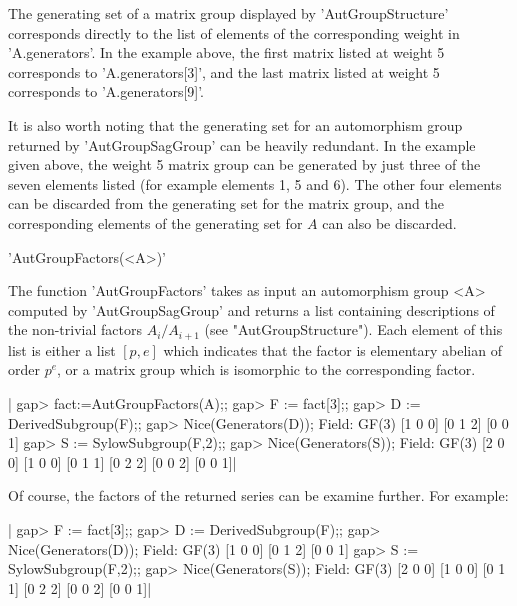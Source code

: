 \bigskip

The generating set of a matrix group displayed by 'AutGroupStructure'
corresponds directly to the list of elements of the corresponding weight in
'A.generators'. In the example above, the first matrix listed at weight 5
corresponds to 'A.generators[3]', and the last matrix listed at weight 5
corresponds to 'A.generators[9]'.


It  is also  worth noting  that the  generating set  for an automorphism group
returned  by 'AutGroupSagGroup' can be heavily redundant. In the example given
above,  the weight 5 matrix group can be  generated by just three of the seven
elements listed (for example elements 1, 5 and 6). The other four elements can
be   discarded  from  the  generating  set  for  the  matrix  group,  and  the
corresponding elements of the generating set for $A$ can also be discarded.


'AutGroupFactors(<A>)' 


The  function  'AutGroupFactors'  takes  as  input  an  automorphism group <A>
computed  by 'AutGroupSagGroup' and returns  a list containing descriptions of
the  non-trivial factors $A_i/A_{i+1}$ (see "AutGroupStructure"). Each element
of  this list  is either  a list  $[p, e]$  which indicates that the factor is
elementary  abelian of order $p^e$,  or a matrix group  which is isomorphic to
the corresponding factor.

|    gap> fact:=AutGroupFactors(A);;
    gap> F := fact[3];;
    gap> D := DerivedSubgroup(F);;
    gap> Nice(Generators(D));
      Field: GF(3)
        [1 0 0]
        [0 1 2]
        [0 0 1]
    gap> S := SylowSubgroup(F,2);;
    gap> Nice(Generators(S));
      Field: GF(3)
        [2 0 0]    [1 0 0]
        [0 1 1]    [0 2 2]
        [0 0 2]    [0 0 1]|

Of course, the factors of the returned series can be examine further. For
example:

|    gap> F := fact[3];;
    gap> D := DerivedSubgroup(F);;
    gap> Nice(Generators(D));
      Field: GF(3)
        [1 0 0]
        [0 1 2]
        [0 0 1]
    gap> S := SylowSubgroup(F,2);;
    gap> Nice(Generators(S));
      Field: GF(3)
        [2 0 0]    [1 0 0]
        [0 1 1]    [0 2 2]
        [0 0 2]    [0 0 1]|


